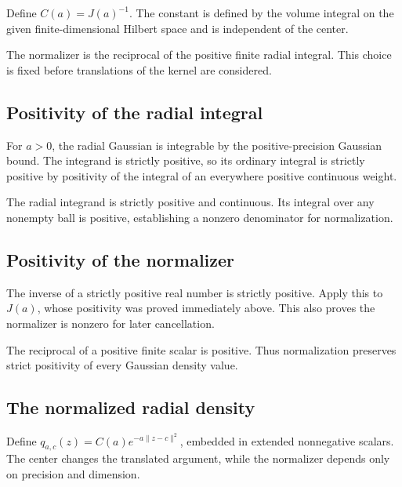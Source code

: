 \documentclass[11pt,a4paper]{report}
\begin{document}
Define \(C(a)=J(a)^{-1}\). The constant is defined by the volume integral on the given finite-dimensional Hilbert space and is independent of the center.



The normalizer is the reciprocal of the positive finite radial integral. This choice is fixed before translations of the kernel are considered.

\subsection{\texorpdfstring{Positivity of the radial integral}{Positivity of the radial integral}}
\label{report-step-UnadjustedLangevin-GaussianProposalDensity-lean-3}


For \(a>0\), the radial Gaussian is integrable by the positive-precision Gaussian bound. The integrand is strictly positive, so its ordinary integral is strictly positive by positivity of the integral of an everywhere positive continuous weight.



The radial integrand is strictly positive and continuous. Its integral over any nonempty ball is positive, establishing a nonzero denominator for normalization.

\subsection{\texorpdfstring{Positivity of the normalizer}{Positivity of the normalizer}}
\label{report-step-UnadjustedLangevin-GaussianProposalDensity-lean-4}


The inverse of a strictly positive real number is strictly positive. Apply this to \(J(a)\), whose positivity was proved immediately above. This also proves the normalizer is nonzero for later cancellation.



The reciprocal of a positive finite scalar is positive. Thus normalization preserves strict positivity of every Gaussian density value.

\subsection{\texorpdfstring{The normalized radial density}{The normalized radial density}}
\label{report-step-UnadjustedLangevin-GaussianProposalDensity-lean-5}


Define \(q_{a,c}(z)=C(a)e^{-a\|z-c\|^2}\), embedded in extended nonnegative scalars. The center changes the translated argument, while the normalizer depends only on precision and dimension.
\end{document}
